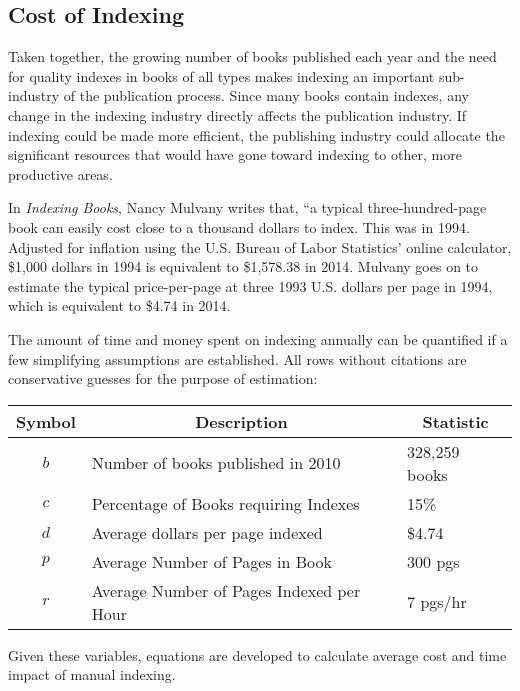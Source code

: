 \subsection{Cost of Indexing}

Taken together, the growing number of books published each year and the need for quality indexes in books of all types makes indexing an important sub-industry of the publication process.
Since many books contain indexes, any change in the indexing industry directly affects the publication industry.
If indexing could be made more efficient, the publishing industry could allocate the significant resources that would have gone toward indexing to other, more productive areas.

In {\it Indexing Books}, Nancy Mulvany writes that, ``a typical three-hundred-page book can easily cost close to a thousand dollars to index.
This was in 1994.
Adjusted for inflation using the U.S. Bureau of Labor Statistics' online calculator, \$1,000 dollars in 1994 is equivalent to \$1,578.38 in 2014\cite{inflation-calculator}.
Mulvany goes on to estimate the typical price-per-page at three 1993 U.S. dollars per page in 1994\cite{mulvany}, which is equivalent to \$4.74 in 2014\cite{inflation-calculator}.

The amount of time and money spent on indexing annually can be quantified if a few simplifying assumptions are established.
All rows without citations are conservative guesses for the purpose of estimation:

\begin{center}
\begin{tabular}{|c|l|l|}
\hline
\multicolumn{1}{|c|}{{\bf Symbol}} & \multicolumn{1}{c|}{{\bf Description}} & \multicolumn{1}{c|}{{\bf Statistic}} \\
\hline
$b$ & Number of books published in 2010 \cite{bowker} & 328,259 books \\
\hline
$c$ & Percentage of Books requiring Indexes & 15\% \\
\hline
$d$ & Average dollars per page indexed \cite{mulvany,inflation-calculator} & \$4.74 \\
\hline 
$p$ & Average Number of Pages in Book & 300 pgs \\ 
\hline 
$r$ & Average Number of Pages Indexed per Hour \cite{connolly} & 7 pgs/hr \\
\hline
\end{tabular}
\end{center}

Given these variables, equations are developed to calculate average cost and time impact of manual indexing.

